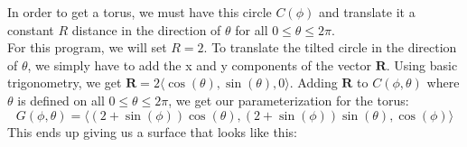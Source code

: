 \documentclass{article}
\begin{document}
\begin{flushleft}
In order to get a torus, we must have this circle $C(\phi)$ and translate it a constant $R$ distance in the direction of $\theta$ for all $0 \leq \theta \leq 2\pi$. \\
For this program, we will set $R = 2$. To translate the tilted circle in the direction of $\theta$, we simply have to add the x and y components of the vector $\mathbf{R}$. Using basic trigonometry, we get $\mathbf{R} = 2\langle \cos(\theta), \sin(\theta), 0 \rangle$. Adding $\mathbf{R}$ to $C(\phi, \theta)$ where $\theta$ is defined on all $0 \leq \theta \leq 2\pi$, we get our parameterization for the torus: $$G(\phi,\theta) = \langle (2+\sin(\phi))\cos(\theta),(2+\sin(\phi))\sin(\theta),\cos(\phi) \rangle$$
This ends up giving us a surface that looks like this:
\end{flushleft}
\centering
{}
\end{document}
